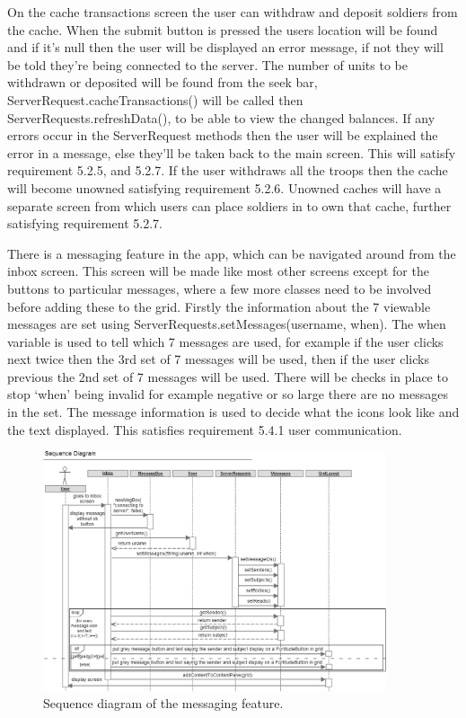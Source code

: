 On the cache transactions screen the user can withdraw and deposit soldiers from the cache. When the submit button is pressed the users location will be found and if it's null then the user will be displayed an error message, if not they will be told they're being connected to the server. The number of units to be withdrawn or deposited will be found from the seek bar, ServerRequest.cacheTransactions() will be called then ServerRequests.refreshData(), to be able to view the changed balances. If any errors occur in the ServerRequest methods then the user will be explained the error in a message, else they'll be taken back to the main screen. This will satisfy requirement 5.2.5, and 5.2.7. If the user withdraws all the troops then the cache will become unowned satisfying requirement 5.2.6. Unowned caches will have a separate screen from which users can place soldiers in to own that cache, further satisfying requirement 5.2.7.

There is a messaging feature in the app, which can be navigated around from the inbox screen. This screen will be made like most other screens except for the buttons to particular messages, where a few more classes need to be involved before adding these to the grid. Firstly the information about the 7 viewable messages are set using ServerRequests.setMessages(username, when). The when variable is used to tell which 7 messages are used, for example if the user clicks next twice then the 3rd set of 7 messages will be used, then if the user clicks previous the 2nd set of 7 messages will be used. There will be checks in place to stop `when' being invalid for example negative or so large there are no messages in the set. The message information is used to decide what the icons look like and the text displayed. This satisfies requirement 5.4.1 user communication.

\begin{figure}
    \centering
    \includegraphics[width=0.9\textwidth]{images/sequence/inbox}
    \caption{Sequence diagram of the messaging feature.}
\end{figure}

